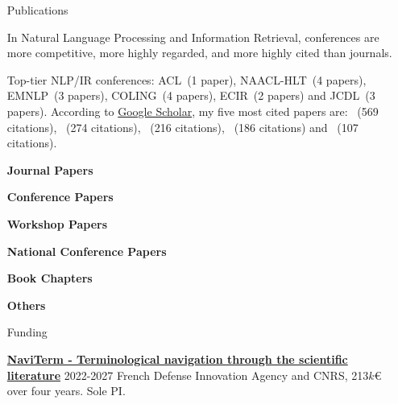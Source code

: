 \documentclass[11pt,a4paper]{article}
\begin{document}
\begin{itemize}
\item[Publications]

In Natural Language Processing and Information Retrieval, conferences are more 
competitive, more highly regarded, and more highly cited than journals.


Top-tier NLP/IR conferences:  ACL~(1 paper), NAACL-HLT~(4 papers), EMNLP~(3 papers), COLING~(4 papers), ECIR~(2 papers) and JCDL~(3 papers).
%
%
According to \href{https://scholar.google.com/citations?user=Vk68rbkAAAAJ}{Google Scholar}, my five most cited papers are: \cite{bougouin-boudin-daille:2013:IJCNLP}~{\small (569 citations)}, \cite{boudin:2018:NAACL}~{\small (274 citations)},  \cite{boudin-EtAl:2010:BMC}~{\small (216 citations)},  \cite{boudin:2013:IJCNLP}~{\small (186 citations)} and \cite{boudin-morin:2013:NAACL-HLT}~{\small (107 citations)}.

\vspace{1em}

\newpage

\nocite{*}

\textbf{Journal Papers}
\printbibliography[heading=none,type=article]


\textbf{Conference Papers}
\printbibliography[heading=none,type=inproceedings,keyword=intConf]


\textbf{Workshop Papers}
\printbibliography[heading=none,type=inproceedings,keyword=workshop]

\textbf{National Conference Papers}
\printbibliography[heading=none,type=inproceedings,keyword=natConf]


\textbf{Book Chapters}
\printbibliography[heading=none,type=inbook]

\textbf{Others}
\printbibliography[heading=none,type=misc]

\item[Funding]

\href{https://cnrs-naviterm.github.io/}{\textbf{NaviTerm - Terminological navigation through the scientific literature}} \hfill 2022-2027 \newline
French Defense Innovation Agency and CNRS, 213$k$\euro{} over four years. Sole PI.


\end{itemize}
\end{document}
